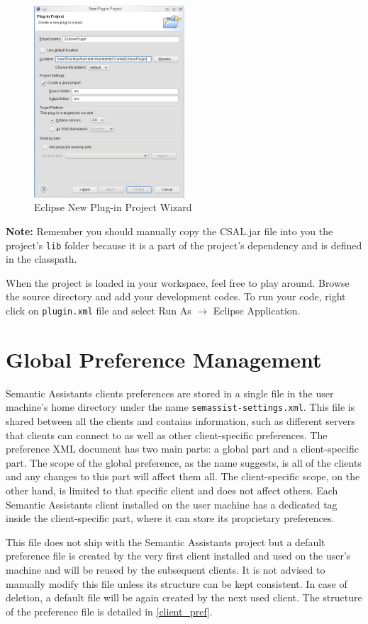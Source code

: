 \begin{figure}[htb]
\begin{center}
  \includegraphics[width=0.5\textwidth]{pictures/eclipse_project_wizard.jpg}
  \caption{Eclipse New Plug-in Project Wizard}
  \label{fig:eclipse_project_wizard}
\end{center}
\end{figure}

\textbf{Note:} Remember you should manually copy the CSAL.jar file into you the
project's \texttt{lib} folder because it is a part of the project's dependency
and is defined in the classpath.

When the project is loaded in your workspace, feel free to play around. Browse
the source directory and add your development codes. To run your code, right
click on \texttt{plugin.xml} file and select Run As $\rightarrow$ Eclipse
Application.

\label{sec:pref_management}
\section{Global Preference Management}
Semantic Assistants clients preferences are stored in a single file in the user machine's home directory under the name \texttt{semassist-settings.xml}. This file is shared between all the clients and contains information, such as different servers that clients can connect to as well as other client-specific preferences. The preference XML document has two main parts: a global part and a client-specific part. The scope of the global preference, as the name suggests, is all of the clients and any changes to this part will affect them all. The client-specific scope, on the other hand, is limited to that specific client and does not affect others. Each Semantic Assistants client installed on the user machine has a dedicated tag inside the client-specific part, where it can store its proprietary preferences.

This file does not ship with the Semantic Assistants project but a default preference file is created by the very first client installed and used on the user's machine and will be reused by the subsequent clients. It is not advised to manually modify this file unless its structure can be kept consistent. In case of deletion, a default file will be again created by the next used client. The structure of the preference file is detailed in \ref{client_pref}.